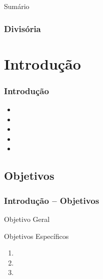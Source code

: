 \documentclass[aspectratio=169]{beamer}
\begin{document}
\begin{frame}
  \titlepage
\end{frame}



\begin{frame}[fragile]{Sumário}
  \tableofcontents
\end{frame}


\begin{frame} \frametitle{Divisória}
\begin{center}
  \lipsum[1][1]
\end{center}
\end{frame}


\section{Introdução}

\begin{frame}[fragile] \frametitle{Introdução}
\begin{itemize} \itemsep1em
    \item \lipsum[1][2]
    \item \lipsum[1][3]
    \item \lipsum[1][4]
    \item \lipsum[1][5]
    \item \lipsum[1][6]
  \end{itemize}
\end{frame}


\subsection{Objetivos}

\begin{frame}[fragile] \frametitle{Introdução -- Objetivos}
\begin{block}{Objetivo Geral}
  \lipsum[1][7-9]
\end{block}
\vspace{1em}
\begin{block}{Objetivos Específicos}
  \begin{enumerate}
    \item \lipsum[1][10]
    \item \lipsum[1][11]
    \item \lipsum[1][12]
  \end{enumerate}
\end{block}
\end{frame}
\end{document}
